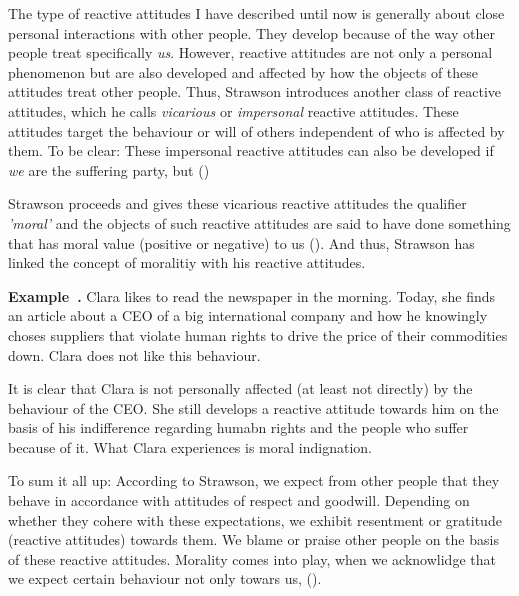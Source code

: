 \documentclass{article}
\newcounter{example}
\newenvironment{example}[1][]{\refstepcounter{example}\par\medskip
   \noindent \textbf{Example~\theexample. #1} \rmfamily}{\medskip}
\begin{document}
The type of reactive attitudes I have described until now is generally about close
personal interactions with other people. They develop because of the way other
people treat specifically \textit{us}. 
However, reactive attitudes are not only a personal phenomenon but are also developed
and affected by how the objects of these attitudes treat other people.
Thus, Strawson introduces another class of reactive attitudes, which he calls
\textit{vicarious} or \textit{impersonal} reactive attitudes. These attitudes
target the behaviour or will of others independent of who is affected by them.
To be clear: These impersonal reactive attitudes can also be
developed if \textit{we} are the suffering party, but (\cite[p.15]{Strawson1962})

Strawson proceeds and gives these vicarious reactive attitudes the
qualifier \textit{'moral'} and the objects of such reactive attitudes are said
to have done something that has moral value (positive or negative) to us
(\cite[p.15]{Strawson1962}). And thus, Strawson has linked the concept of
moralitiy with his reactive attitudes.


\begin{example}
	Clara likes to read the newspaper in the morning. Today, she finds an
	article about a CEO of a big international company and how he knowingly
	choses suppliers that violate human rights to drive the price of their
	commodities down. Clara does not like this behaviour.
\end{example}


It is clear that Clara is not personally affected (at least not directly) by the
behaviour of the CEO. She still develops a reactive attitude towards him on the
basis of his indifference regarding humabn rights and the people who suffer
because of it. What Clara experiences is moral indignation.

To sum it all up: According to Strawson, we expect from other people that they
behave in accordance with attitudes of respect and goodwill. Depending on
whether they cohere with these expectations, we exhibit resentment or gratitude
(reactive attitudes) towards them. We blame or praise other people on the basis
of these reactive attitudes. Morality comes into play, when we acknowlidge that
we expect certain behaviour not only towars us,  (\cite[p.16]{Strawson1962}).
\end{document}
